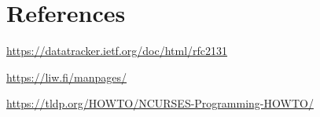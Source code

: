\documentclass[a4paper]{article}
\begin{document}
\section{References}

\begin{thebibliography}{3}
  
  \url{https://datatracker.ietf.org/doc/html/rfc2131}

  \url{https://liw.fi/manpages/}

  \url{https://tldp.org/HOWTO/NCURSES-Programming-HOWTO/}

\end{thebibliography}
\end{document}
